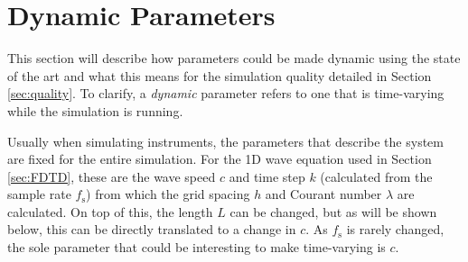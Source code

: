 \documentclass[dvipsnames, preprint]{JASA}
\begin{document}
\section{Dynamic Parameters}
This section will describe how parameters could be made dynamic using the state of the art and what this means for the simulation quality detailed in Section \ref{sec:quality}. %
To clarify, a \textit{dynamic} parameter refers to one that is time-varying while the simulation is running. 


Usually when simulating instruments, the parameters that describe the system are fixed for the entire simulation. For the 1D wave equation used in Section \ref{sec:FDTD}, these are the wave speed $c$ and time step $k$ (calculated from the sample rate $f_\text{s}$) from which the grid spacing $h$ and Courant number $\lambda$ are calculated. On top of this, the length $L$ can be changed, but as will be shown below, this can be directly translated to a change in $c$. As $f_\text{s}$ is rarely changed, the sole parameter that could be interesting to make time-varying is $c$. 

%
%
\end{document}
